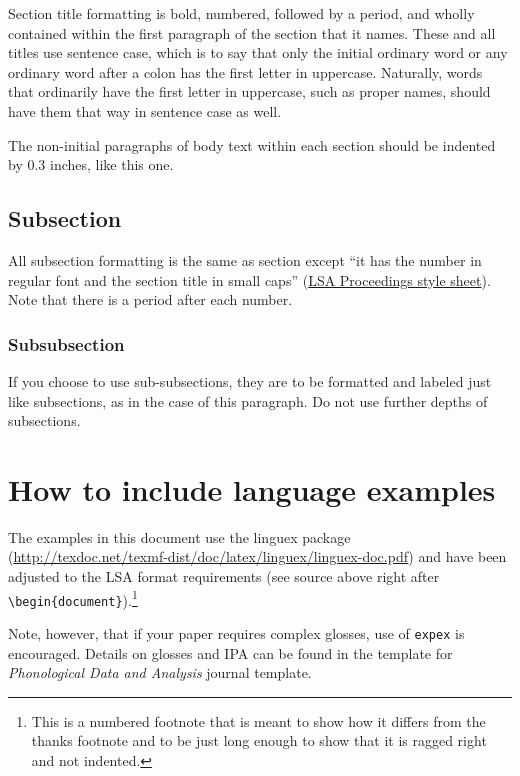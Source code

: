 \documentclass[12pt,letterpaper]{article}
\begin{document}
Section title formatting is bold, numbered, followed by a period, and wholly contained within the first paragraph of the section that it names. These and all titles use sentence case, which is to say that only the initial ordinary word or any ordinary word after a colon has the first letter in uppercase. Naturally, words that ordinarily have the first letter in uppercase, such as proper names, should have them that way in sentence case as well.

The non-initial paragraphs of body text within each section should be indented by 0.3 inches, like this one.
 
 
\subsection{Subsection} 
All subsection formatting is the same as section except ``it has the number in regular font and the section title in small caps'' (\href{http://journals.linguisticsociety.org/proceedings/index.php/PLSA/pages/view/instructions}{LSA Proceedings style sheet}). Note that there is a period after each number.

\subsubsection{Subsubsection}
If you choose to use sub-subsections, they are to be formatted and labeled just like subsections, as in the case of this paragraph. Do not use further depths of subsections.

\section{How to include language examples}

The examples in this document use the linguex package 	(\href{http://texdoc.net/texmf-dist/doc/latex/linguex/linguex-doc.pdf}{http://texdoc.net/texmf-dist/doc/latex/linguex/linguex-doc.pdf}) and have been adjusted to the LSA format requirements (see source above right after \verb=\begin{document}=).\footnote{This is a numbered footnote that is meant to show how it differs from the thanks footnote and to be just long enough to show that it is ragged right and not indented.} 

Note, however, that if your paper requires complex glosses, use of \verb=expex= is encouraged. Details on glosses and IPA can be found in the template for \textit{Phonological Data and Analysis} journal template.
\end{document}
